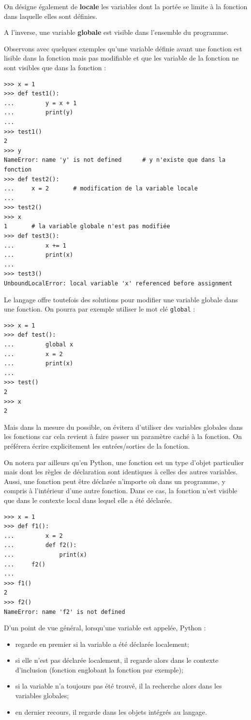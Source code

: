 \documentclass[12pt, a4paper]{article}
\begin{document}
On désigne également de \textbf{locale} les variables dont la portée se limite à la fonction dans laquelle elles sont définies.

A l'inverse, une variable \textbf{globale} est visible dans l'ensemble du programme.

Observons avec quelques exemples qu'une variable définie avant une fonction est lisible dans la fonction mais pas modifiable et que les variable de la fonction ne sont visibles que dans la fonction :
\begin{lstlisting}
>>> x = 1
>>> def test1():
...			y = x + 1
... 		print(y)
...
>>> test1()
2
>>> y
NameError: name 'y' is not defined		# y n'existe que dans la fonction
>>> def test2():
...     x = 2		# modification de la variable locale
...
>>> test2()
>>> x
1		# la variable globale n'est pas modifiée
>>> def test3():
...			x += 1
... 		print(x)
...
>>> test3()
UnboundLocalError: local variable 'x' referenced before assignment
\end{lstlisting}

Le langage offre toutefois des solutions pour modifier une variable globale dans une fonction. On pourra par exemple utiliser le mot clé \lstinline{global} :
\begin{lstlisting}
>>> x = 1
>>> def test():
...			global x
...			x = 2
... 		print(x)
...
>>> test()
2
>>> x
2
\end{lstlisting}

Mais dans la mesure du possible, on évitera d'utiliser des variables globales dans les fonctions car cela revient à faire passer un paramètre caché à la fonction. On préférera écrire explicitement les entrées/sorties de la fonction.

On notera par ailleurs qu'en Python, une fonction est un type d'objet particulier mais dont les règles de déclaration sont identiques à celles des autres variables. Aussi, une fonction peut être déclarée n'importe où dans un programme, y compris à l'intérieur d'une autre fonction. Dans ce cas, la fonction n'est visible que dans le contexte local dans lequel elle a été déclarée.
\begin{lstlisting}
>>> x = 1
>>> def f1():
...			x = 2
...			def f2():
... 		    print(x)
...     f2()
...
>>> f1()
2
>>> f2()
NameError: name 'f2' is not defined
\end{lstlisting}

D'un point de vue général, lorsqu'une variable est appelée, Python :
\begin{itemize}
	\item regarde en premier si la variable a été déclarée localement;
	\item si elle n'est pas déclarée localement, il regarde alors dans le contexte d'inclusion (fonction englobant la fonction par exemple);
	\item si la variable n'a toujours pas été trouvé, il la recherche alors dans les variables globales;
	\item en dernier recours, il regarde dans les objets intégrés au langage.
\end{itemize}
\end{document}
